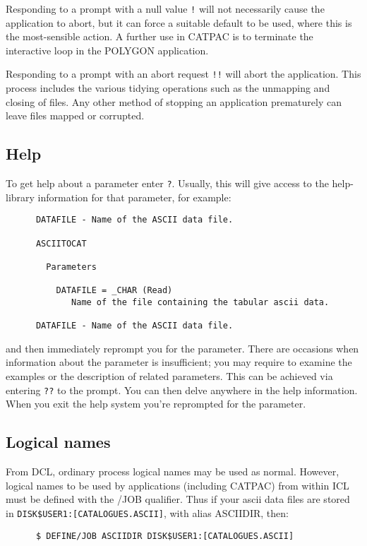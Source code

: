 Responding to a prompt with a null value {\tt !} will not necessarily
cause the application to abort, but it can force a suitable default to
be used, where this is the most-sensible action. A further use in CATPAC
is to terminate the interactive loop in the POLYGON application.

Responding to a prompt with an abort request {\tt !!} will abort the
application.  This process includes the various tidying operations
such as the unmapping and closing of files.  Any other method of
stopping an application prematurely can leave files mapped or corrupted. 

\subsection{Help}
\label{se:parhelp}

To get help about a parameter enter {\tt ?}.  Usually, this will give
access to the help-library
information for that parameter, for example:
\begin{verbatim}
      DATAFILE - Name of the ASCII data file.
 
      ASCIITOCAT
 
        Parameters
 
          DATAFILE = _CHAR (Read)
             Name of the file containing the tabular ascii data.
 
      DATAFILE - Name of the ASCII data file.
\end{verbatim}

and then immediately reprompt you for the parameter.  There are occasions when
information about the parameter is insufficient; you may require to examine the
examples or the description of related parameters.  This can be achieved via
entering {\tt ??} to the prompt. You can then delve anywhere in the help
information.  When you exit the help system you're reprompted for the
parameter.

\subsection{Logical names}

From {\small DCL}, ordinary process logical names may be used as normal.
However, logical names to be used by applications (including {\small CATPAC})
from within {\small ICL} must be defined with the /JOB qualifier. Thus if your
ascii data files are stored in {\tt DISK\$USER1:[CATALOGUES.ASCII]}, with alias
ASCIIDIR, then:

\begin{verbatim}
      $ DEFINE/JOB ASCIIDIR DISK$USER1:[CATALOGUES.ASCII]
\end{verbatim}

